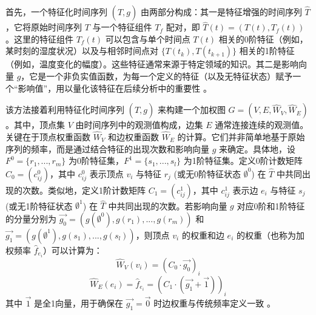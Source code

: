 首先，一个特征化时间序列 $(\hat{T}, g)$ 由两部分构成：其一是特征增强的时间序列 $\hat{T}$，它将原始时间序列 $T$ 与一个特征组件 $T_f$ 配对，即 $\hat{T}(t) = (T(t), T_f(t))$。这里的特征组件 $T_f(t)$ 可以包含与单个时间点 $T(t)$ 相关的0阶特征（例如，某时刻的湿度状况）以及与相邻时间点对 $\{T(t_k), T(t_{k+1})\}$ 相关的1阶特征（例如，温度变化的幅度）。这些特征通常来源于特定领域的知识。其二是影响向量 $g$，它是一个非负实值函数，为每一个定义的特征（以及无特征状态）赋予一个“影响值”，用以量化该特征在后续分析中的重要性 。

该方法接着利用特征化时间序列 $(\hat{T}, g)$ 来构建一个加权图 $G=(V,E,\hat{W}_V,\hat{W}_E)$。其中，顶点集 $V$ 由时间序列中的观测值构成，边集 $E$ 通常连接连续的观测值。关键在于顶点权重函数 $\hat{W}_V$ 和边权重函数 $\hat{W}_E$ 的计算。它们并非简单地基于原始序列的频率，而是通过结合特征的出现次数和影响向量 $g$ 来确定。具体地，设 $F^0 = \{r_1, ..., r_m\}$ 为0阶特征集，$F^1 = \{s_1, ..., s_l\}$ 为1阶特征集。定义0阶计数矩阵 $C_0=(c_{ij}^0)$，其中 $c_{ij}^0$ 表示顶点 $v_i$ 与特征 $r_j$ (或无0阶特征状态 $\emptyset^0$) 在 $\hat{T}$ 中共同出现的次数。类似地，定义1阶计数矩阵 $C_1=(c_{ij}^1)$，其中 $c_{ij}^1$ 表示边 $e_i$ 与特征 $s_j$ (或无1阶特征状态 $\emptyset^1$) 在 $\hat{T}$ 中共同出现的次数。若影响向量 $g$ 对应0阶和1阶特征的分量分别为 $\vec{g_0} = (g(\emptyset^0), g(r_1), ..., g(r_m))$ 和 $\vec{g_1} = (g(\emptyset^1), g(s_1), ..., g(s_l))$，则顶点 $v_i$ 的权重和边 $e_i$ 的权重（也称为加权频率 $\hat{f}_{e_i}$）可以计算为：
\begin{equation}
\label{eq:featured_vertex_weight_revised}
\hat{W}_V(v_i) = (C_0 \cdot \vec{g_0})_i
\end{equation}
\begin{equation}
\label{eq:featured_edge_weight_revised}
\hat{W}_E(e_i) = \hat{f}_{e_i} = (C_1 \cdot (\vec{g_1} + \vec{1}))_i
\end{equation}
其中 $\vec{1}$ 是全1向量，用于确保在 $\vec{g_1}=\vec{0}$ 时边权重与传统频率定义一致 。


